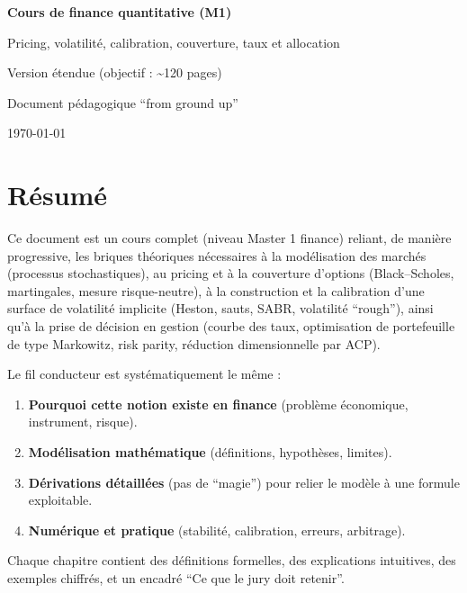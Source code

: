 \documentclass[11pt,a4paper]{report}
\newcommand{\1}{\mathbbm{1}}
\theoremstyle{definition}
\theoremstyle{plain}
\theoremstyle{remark}
\begin{document}
\begin{titlepage}
  \centering
  \vspace*{2cm}
  {\LARGE\bfseries Cours de finance quantitative (M1)\par}
  \vspace{0.5cm}
  {\Large Pricing, volatilité, calibration, couverture, taux et allocation\par}
  \vspace{0.25cm}
  {\large Version étendue (objectif : \textasciitilde 120 pages)\par}
  \vspace{0.2cm}
  {\large Document pédagogique ``from ground up''\par}
  \vfill
  {\large \today\par}
\end{titlepage}

\chapter*{Résumé}
Ce document est un cours complet (niveau Master 1 finance) reliant, de manière progressive,
les briques théoriques nécessaires à la modélisation des marchés (processus stochastiques),
au pricing et à la couverture d'options (Black--Scholes, martingales, mesure risque-neutre),
à la construction et la calibration d'une surface de volatilité implicite (Heston, sauts, SABR, volatilité ``rough''),
ainsi qu'à la prise de décision en gestion (courbe des taux, optimisation de portefeuille de type Markowitz, risk parity,
réduction dimensionnelle par ACP).

Le fil conducteur est systématiquement le même :
\begin{enumerate}[label=\arabic*)]
  \item \textbf{Pourquoi cette notion existe en finance} (problème économique, instrument, risque).
  \item \textbf{Modélisation mathématique} (définitions, hypothèses, limites).
  \item \textbf{Dérivations détaillées} (pas de ``magie'') pour relier le modèle à une formule exploitable.
  \item \textbf{Numérique et pratique} (stabilité, calibration, erreurs, arbitrage).
\end{enumerate}
Chaque chapitre contient des définitions formelles, des explications intuitives, des exemples chiffrés,
et un encadré ``Ce que le jury doit retenir''.
\end{document}
